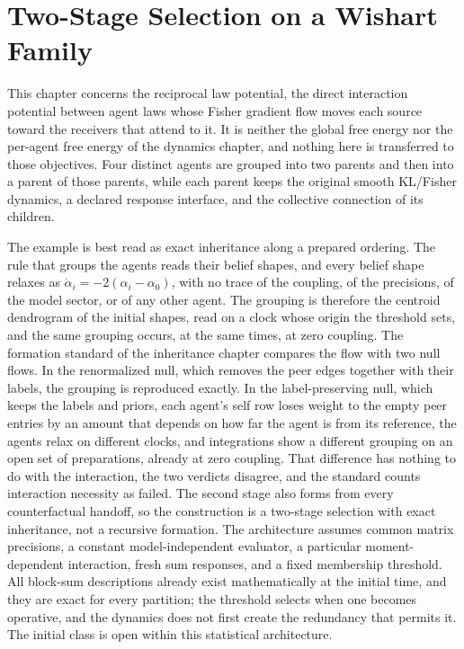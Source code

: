 \chapter{Two-Stage Selection on a Wishart Family}
\label{cf:formation}

This chapter concerns the reciprocal law potential, the direct interaction potential between agent laws whose Fisher gradient flow moves each source toward the receivers that attend to it. It is neither the global free energy nor the per-agent free energy of the dynamics chapter, and nothing here is transferred to those objectives. Four distinct agents are grouped into two parents and then into a parent of those parents, while each parent keeps the original smooth KL/Fisher dynamics, a declared response interface, and the collective connection of its children.

The example is best read as exact inheritance along a prepared ordering. The rule that groups the agents reads their belief shapes, and every belief shape relaxes as $\dot\alpha_i=-2(\alpha_i-\alpha_0)$, with no trace of the coupling, of the precisions, of the model sector, or of any other agent. The grouping is therefore the centroid dendrogram of the initial shapes, read on a clock whose origin the threshold sets, and the same grouping occurs, at the same times, at zero coupling. The formation standard of the inheritance chapter compares the flow with two null flows. In the renormalized null, which removes the peer edges together with their labels, the grouping is reproduced exactly. In the label-preserving null, which keeps the labels and priors, each agent's self row loses weight to the empty peer entries by an amount that depends on how far the agent is from its reference, the agents relax on different clocks, and integrations show a different grouping on an open set of preparations, already at zero coupling. That difference has nothing to do with the interaction, the two verdicts disagree, and the standard counts interaction necessity as failed. The second stage also forms from every counterfactual handoff, so the construction is a two-stage selection with exact inheritance, not a recursive formation. The architecture assumes common matrix precisions, a constant model-independent evaluator, a particular moment-dependent interaction, fresh sum responses, and a fixed membership threshold. All block-sum descriptions already exist mathematically at the initial time, and they are exact for every partition; the threshold selects when one becomes operative, and the dynamics does not first create the redundancy that permits it. The initial class is open within this statistical architecture.

